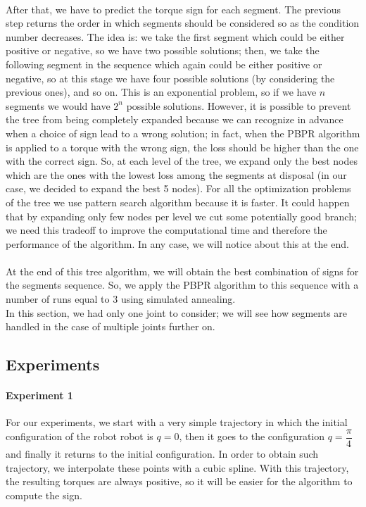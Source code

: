 \documentclass{article}
\begin{document}
\paragraph{}After that, we have to predict the torque sign for each segment. The previous step returns the order in which segments should be considered so as the condition number decreases. The idea is: we take the first segment which could be either positive or negative, so we have two possible solutions; then, we take the following segment in the sequence which again could be either positive or negative, so at this stage we have four possible solutions (by considering the previous ones), and so on. This is an exponential problem, so if we have $n$ segments we would have $2^n$ possible solutions. However, it is possible to prevent the tree from being completely expanded because we can recognize in advance when a choice of sign lead to a wrong solution; in fact, when the PBPR algorithm is applied to a torque with the wrong sign, the loss should be higher than the one with the correct sign. So, at each level of the tree, we expand only the best nodes which are the ones with the lowest loss among the segments at disposal (in our case, we decided to expand the best 5 nodes).  For all the optimization problems of the tree we use pattern search algorithm because it is faster. It could happen that by expanding only few nodes per level we cut some potentially good branch; we need this tradeoff to improve the computational time and therefore the performance of the algorithm. In any case, we will notice about this at the end.

\paragraph{}At the end of this tree algorithm, we will obtain the best combination of signs for the segments sequence. So, we apply the PBPR algorithm to this sequence with a number of runs equal to 3 using simulated annealing.\\

In this section, we had only one joint to consider; we will see how segments are handled in the case of multiple joints further on.

\subsection{Experiments}
\paragraph{Experiment 1}
For our experiments, we start with a very simple trajectory in which the initial configuration of the robot robot is $q = 0$, then it goes to the configuration $q = \dfrac{\pi}{4}$ and finally it returns to the initial configuration. In order to obtain such trajectory, we interpolate these points with a cubic spline. With this trajectory, the resulting torques are always positive, so it will be easier for the algorithm to compute the sign.
\end{document}
